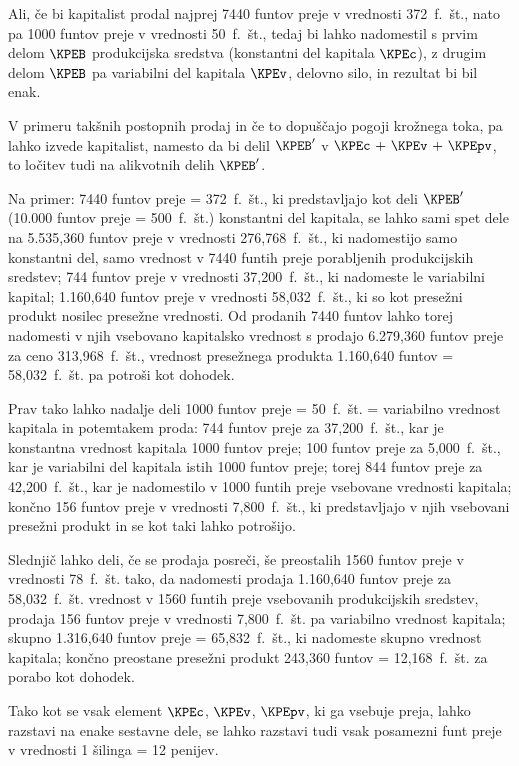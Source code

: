\documentclass[kapital_02.tex]{subfiles}
\begin{document}
Ali, če bi kapitalist prodal najprej 7440 funtov preje v vrednosti 372~f.~št., nato pa 1000 funtov preje v vrednosti 50~f.~št., tedaj bi lahko nadomestil s prvim delom \( \KPEB \) produkcijska sredstva (konstantni del kapitala \( \KPEc \)), z drugim delom \( \KPEB \) pa variabilni del kapitala \( \KPEv \), delovno silo, in rezultat bi bil enak.

V primeru takšnih postopnih prodaj in če to dopuščajo pogoji krožnega toka, pa lahko izvede kapitalist, namesto da bi delil \( \KPEB' \) v \( \KPEc \textrm{ + }  \KPEv \textrm{ + } \KPEpv \), to ločitev tudi na alikvotnih delih \( \KPEB' \).

Na primer: 7440 funtov preje = 372~f.~št., ki predstavljajo kot deli \( \KPEB' \) (10.000 funtov preje = 500~f.~št.) konstantni del kapitala, se lahko sami spet dele na 5.535,360 funtov preje v vrednosti 276,768~f.~št., ki nadomestijo samo konstantni del, samo vrednost v 7440 funtih preje porabljenih produkcijskih sredstev; 744 funtov preje v vrednosti 37,200~f.~št., ki nadomeste le variabilni kapital; 1.160,640 funtov preje v vrednosti 58,032~f.~št., ki so kot presežni produkt nosilec presežne vrednosti. Od prodanih 7440 funtov lahko torej nadomesti v njih vsebovano kapitalsko vrednost s prodajo 6.279,360 funtov preje za ceno 313,968~f.~št., vrednost presežnega produkta 1.160,640 funtov = 58,032~f.~št. pa potroši kot dohodek.

Prav tako lahko nadalje deli 1000 funtov preje = 50~f.~št. = variabilno vrednost kapitala in potemtakem proda: 744 funtov preje za 37,200~f.~št., kar je konstantna vrednost kapitala 1000 funtov preje; 100 funtov preje za 5,000~f.~št., kar je variabilni del kapitala istih 1000 funtov preje; torej 844 \KPEstran funtov preje za 42,200~f.~št., kar je nadomestilo v 1000 funtih preje vsebovane vrednosti kapitala; končno 156 funtov preje v vrednosti 7,800~f.~št., ki predstavljajo v njih vsebovani presežni produkt in se kot taki lahko potrošijo.

Slednjič lahko deli, če se prodaja posreči, še preostalih 1560 funtov preje v vrednosti 78~f.~št. tako, da nadomesti prodaja 1.160,640 funtov preje za 58,032~f.~št. vrednost v 1560 funtih preje vsebovanih produkcijskih sredstev, prodaja 156 funtov preje v vrednosti 7,800~f.~št. pa variabilno vrednost kapitala; skupno 1.316,640 funtov preje = 65,832~f.~št., ki nadomeste skupno vrednost kapitala; končno preostane presežni produkt 243,360 funtov = 12,168~f.~št. za porabo kot dohodek.

Tako kot se vsak element \( \KPEc \), \( \KPEv \), \( \KPEpv \), ki ga vsebuje preja, lahko razstavi na enake sestavne dele, se lahko razstavi tudi vsak posamezni funt preje v vrednosti 1 šilinga = 12 penijev.
\end{document}
